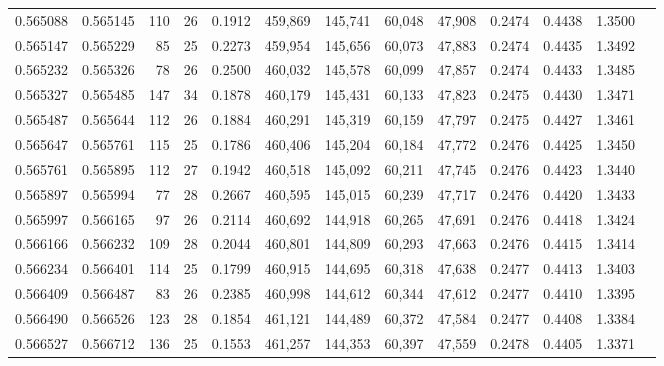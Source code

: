 \begin{tabular}{rrrrrrrrrrrrr}
0.565088 & 0.565145 & 110 &  26 &                                     0.1912 & 459,869 & 145,741 &  60,048 &  47,908 & 0.2474 & 0.4438 & 1.3500 \\
0.565147 & 0.565229 &  85 &  25 &                                     0.2273 & 459,954 & 145,656 &  60,073 &  47,883 & 0.2474 & 0.4435 & 1.3492 \\
0.565232 & 0.565326 &  78 &  26 &                                     0.2500 & 460,032 & 145,578 &  60,099 &  47,857 & 0.2474 & 0.4433 & 1.3485 \\
0.565327 & 0.565485 & 147 &  34 &                                     0.1878 & 460,179 & 145,431 &  60,133 &  47,823 & 0.2475 & 0.4430 & 1.3471 \\
0.565487 & 0.565644 & 112 &  26 &                                     0.1884 & 460,291 & 145,319 &  60,159 &  47,797 & 0.2475 & 0.4427 & 1.3461 \\
0.565647 & 0.565761 & 115 &  25 &                                     0.1786 & 460,406 & 145,204 &  60,184 &  47,772 & 0.2476 & 0.4425 & 1.3450 \\
0.565761 & 0.565895 & 112 &  27 &                                     0.1942 & 460,518 & 145,092 &  60,211 &  47,745 & 0.2476 & 0.4423 & 1.3440 \\
0.565897 & 0.565994 &  77 &  28 &                                     0.2667 & 460,595 & 145,015 &  60,239 &  47,717 & 0.2476 & 0.4420 & 1.3433 \\
0.565997 & 0.566165 &  97 &  26 &                                     0.2114 & 460,692 & 144,918 &  60,265 &  47,691 & 0.2476 & 0.4418 & 1.3424 \\
0.566166 & 0.566232 & 109 &  28 &                                     0.2044 & 460,801 & 144,809 &  60,293 &  47,663 & 0.2476 & 0.4415 & 1.3414 \\
0.566234 & 0.566401 & 114 &  25 &                                     0.1799 & 460,915 & 144,695 &  60,318 &  47,638 & 0.2477 & 0.4413 & 1.3403 \\
0.566409 & 0.566487 &  83 &  26 &                                     0.2385 & 460,998 & 144,612 &  60,344 &  47,612 & 0.2477 & 0.4410 & 1.3395 \\
0.566490 & 0.566526 & 123 &  28 &                                     0.1854 & 461,121 & 144,489 &  60,372 &  47,584 & 0.2477 & 0.4408 & 1.3384 \\
0.566527 & 0.566712 & 136 &  25 &                                     0.1553 & 461,257 & 144,353 &  60,397 &  47,559 & 0.2478 & 0.4405 & 1.3371 \\

\end{tabular}
